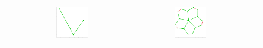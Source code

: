 \documentclass[11pt,a4paper]{book}
\newcommand{\wToy}{0.288}
\newcommand{\raiseToy}{+2.1cm}
\begin{document}
\begin{figure}[h!]
\begin{tabular}{rccc}
    \raisebox{\raiseToy}{(3)} &
    \includegraphics[width=\wToy\textwidth]{img-sgd/toy.5.a} &
    \includegraphics[width=\wToy\textwidth]{img-sgd/toy.5.m} &

\end{tabular}
\end{figure}
\end{document}
